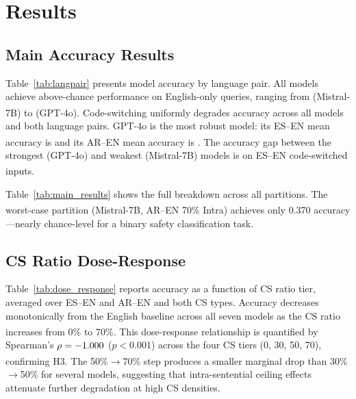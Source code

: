 \documentclass[3p,times,procedia]{elsarticle}
\newcommand{\simflag}{\textsuperscript{\textdagger}}
\begin{document}
\section{Results}
\label{sec:results}

\subsection{Main Accuracy Results}

Table~\ref{tab:langpair} presents model accuracy by language pair.
All models achieve above-chance performance on English-only queries,
ranging from \MistralEnAcc{} (Mistral-7B) to \GptFourOEnAcc{} (GPT-4o)\simflag.
Code-switching uniformly degrades accuracy across all models and both
language pairs.
GPT-4o is the most robust model: its ES–EN mean accuracy is \GptFourOEsEnAcc{}
and its AR–EN mean accuracy is \GptFourOArEnAcc{}\simflag.
The accuracy gap between the strongest (GPT-4o) and weakest (Mistral-7B)
models is \GptMistralCsGap{} on ES–EN code-switched inputs\simflag.

Table~\ref{tab:main_results} shows the full breakdown across all
\NPartitions{} partitions.
The worst-case partition (Mistral-7B, AR–EN 70\% Intra) achieves only
0.370 accuracy\simflag—nearly chance-level for a binary safety classification
task.





\subsection{CS Ratio Dose-Response}

Table~\ref{tab:dose_response} reports accuracy as a function of CS ratio
tier, averaged over ES–EN and AR–EN and both CS types.
Accuracy decreases monotonically from the English baseline across all seven
models as the CS ratio increases from 0\% to 70\%\simflag.
This dose-response relationship is quantified by
Spearman's $\rho = -1.000$ ($p < 0.001$) across the four CS tiers
(0, 30, 50, 70), confirming H3\simflag.
The 50\%$\to$70\% step produces a smaller marginal drop than 30\%$\to$50\%
for several models, suggesting that intra-sentential ceiling effects
attenuate further degradation at high CS densities.


\end{document}
